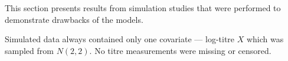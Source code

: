 This section presents results from simulation studies that were performed to demonstrate drawbacks of the models.

Simulated data always contained only one covariate --- log-titre $X$ which was sampled from $N(2, 2)$. No titre measurements were missing or censored.

